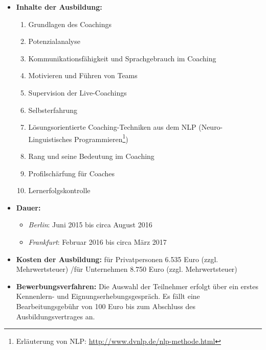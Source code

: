 \documentclass[11pt,a4paper]{article}
\begin{document}
	\begin{itemize}
	\item \textbf{Inhalte der Ausbildung:}

			\begin{enumerate}
			\item Grundlagen des Coachings
			\item Potenzialanalyse
			\item Kommunikationsfähigkeit und Sprachgebrauch im Coaching
			\item Motivieren und Führen von Teams
			\item Supervision der Live-Coachings
			\item Selbsterfahrung
			\item Lösungsorientierte Coaching-Techniken aus dem NLP (Neuro-Linguistisches Programmieren\footnote{Erläuterung von NLP: \textsf{\textcolor{MidnightBlue}{\url{http://www.dvnlp.de/nlp-methode.html}}}})
			\item Rang und seine Bedeutung im Coaching
			\item Profilschärfung für Coaches
			\item Lernerfolgskontrolle
			\end{enumerate}

	\item \textbf{Dauer:}

		\begin{itemize} 
		\item \textsl{Berlin}: Juni 2015 bis circa August 2016
		\item \textsl{Frankfurt}: Februar 2016 bis circa März 2017
		\end{itemize}

	\item \textbf{Kosten der Ausbildung:} für Privatpersonen 6.535 Euro (zzgl. Mehrwertsteuer) /für Unternehmen 8.750 Euro (zzgl. Mehrwertsteuer)\\

	\item \textbf{Bewerbungsverfahren:} Die Auswahl der Teilnehmer erfolgt über ein erstes Kennenlern- und Eignungserhebungsgespräch. Es fällt eine Bearbeitungsgebühr von 100 Euro bis zum Abschluss des Ausbildungsvertrages an.

	\end{itemize}

\end{document}
